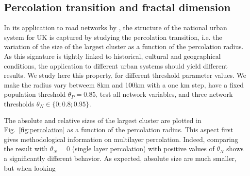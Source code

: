 \documentclass{jimis-en}
\begin{document}
\subsection{Percolation transition and fractal dimension}



In its application to road networks by \cite{arcaute2016cities}, the structure of the national urban system for UK is captured by studying the percolation transition, i.e. the variation of the size of the largest cluster as a function of the percolation radius. As this signature is tightly linked to historical, cultural and geographical conditions, the application to different urban systems should yield different results. We study here this property, for different threshold parameter values. We make the radius vary betweem 8km and 100km with a one km step, have a fixed population threshold $\theta_P = 0.85$, test all network variables, and three network thresholds $\theta_N \in \{ 0 ; 0.8 ; 0.95 \}$.

The absolute and relative sizes of the largest cluster are plotted in Fig.~\ref{fig:percolation} as a function of the percolation radius. This aspect first gives methodological information on multilayer percolation. Indeed, comparing the result with $\theta_N = 0$ (single layer percolation) with positive values of $\theta_N$ shows a significantly different behavior. As expected, absolute size are much smaller, but when looking 



\end{document}
